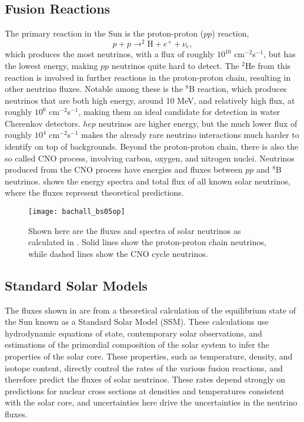 \subsection{Fusion Reactions}

The primary reaction in the Sun is the proton-proton ($pp$) reaction,
\begin{equation}
p+p \rightarrow ^2\mathrm{H}+e^++\nu_e,
\end{equation}
which produces the most neutrinos, with a flux of roughly $10^{10}$ cm$^{-2}$s$^{-1}$, but has the lowest energy, making $pp$ neutrinos quite hard to detect.
The $^2$He from this reaction is involved in further reactions in the proton-proton chain, resulting in other neutrino fluxes.
Notable among these is the $^8$B reaction, which produces neutrinos that are both high energy, around 10 MeV, and relatively high flux, at roughly $10^6$ cm$^{-2}$s$^{-1}$, making them an ideal candidate for detection in water Cherenkov detectors.
$hep$ neutrinos are higher energy, but the much lower flux of roughly $10^4$ cm$^{-2}$s$^{-1}$ makes the already rare neutrino interactions much harder to identify on top of backgrounds.
Beyond the proton-proton chain, there is also the so called CNO process, involving carbon, oxygen, and nitrogen nuclei. 
Neutrinos produced from the CNO process have energies and fluxes between $pp$ and $^8$B neutrinos.
 shows the energy spectra and total flux of all known solar neutrinos, where the fluxes represent theoretical predictions.

\begin{figure}
\centering
\texttt{[image: bachall\_bs05op]}
\caption{\label{neutrino_spectra}Shown here are the fluxes and spectra of solar neutrinos as calculated in \cite{bs05op}.
    Solid lines show the proton-proton chain neutrinos, while dashed lines show the CNO cycle neutrinos.}
\end{figure}

\subsection{Standard Solar Models}

The fluxes shown in  are from a theoretical calculation of the equilibrium state of the Sun known as a Standard Solar Model (SSM).
These calculations use hydrodynamic equations of state, contemporary solar observations, and estimations of the primordial composition of the solar system to infer the properties of the solar core.
These properties, such as temperature, density, and isotope content, directly control the rates of the various fusion reactions, and therefore predict the fluxes of solar neutrinos.
These rates depend strongly on predictions for nuclear cross sections at densities and temperatures consistent with the solar core, and uncertainties here drive the uncertainties in the neutrino fluxes.

